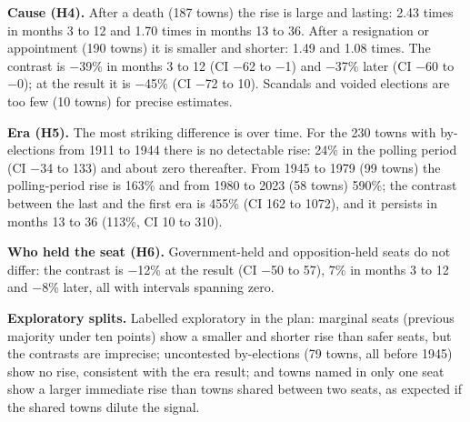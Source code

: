 \documentclass[11pt,a4paper]{article}
\begin{document}
\textbf{Cause (H4).} After a death (187 towns) the rise is large and lasting: 2.43 times in months 3 to 12 and 1.70 times in months 13 to 36. After a resignation or appointment (190 towns) it is smaller and shorter: 1.49 and 1.08 times. The contrast is $-$39\% in months 3 to 12 (CI $-$62 to $-$1) and $-$37\% later (CI $-$60 to $-$0); at the result it is $-$45\% (CI $-$72 to 10). Scandals and voided elections are too few (10 towns) for precise estimates.

\textbf{Era (H5).} The most striking difference is over time. For the 230 towns with by-elections from 1911 to 1944 there is no detectable rise: 24\% in the polling period (CI $-$34 to 133) and about zero thereafter. From 1945 to 1979 (99 towns) the polling-period rise is 163\% and from 1980 to 2023 (58 towns) 590\%; the contrast between the last and the first era is 455\% (CI 162 to 1072), and it persists in months 13 to 36 (113\%, CI 10 to 310).

\textbf{Who held the seat (H6).} Government-held and opposition-held seats do not differ: the contrast is $-$12\% at the result (CI $-$50 to 57), 7\% in months 3 to 12 and $-$8\% later, all with intervals spanning zero.

\textbf{Exploratory splits.} Labelled exploratory in the plan: marginal seats (previous majority under ten points) show a smaller and shorter rise than safer seats, but the contrasts are imprecise; uncontested by-elections (79 towns, all before 1945) show no rise, consistent with the era result; and towns named in only one seat show a larger immediate rise than towns shared between two seats, as expected if the shared towns dilute the signal.
\end{document}
